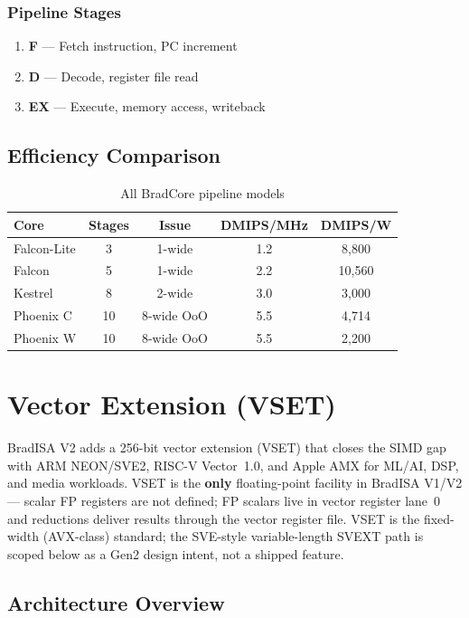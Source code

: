 \documentclass[11pt,a4paper]{article}
\begin{document}
\subsubsection*{Pipeline Stages}
\begin{enumerate}[nosep]
  \item \textbf{F} --- Fetch instruction, PC increment
  \item \textbf{D} --- Decode, register file read
  \item \textbf{EX} --- Execute, memory access, writeback
\end{enumerate}

\subsection{Efficiency Comparison}

\begin{table}[H]
\centering
\caption{All BradCore pipeline models}
\begin{tabular}{lcccc}
\toprule
Core & Stages & Issue & DMIPS/MHz & DMIPS/W \\
\midrule
Falcon-Lite & 3 & 1-wide & 1.2 & 8,800 \\
Falcon & 5 & 1-wide & 2.2 & 10,560 \\
Kestrel & 8 & 2-wide & 3.0 & 3,000 \\
Phoenix C & 10 & 8-wide OoO & 5.5 & 4,714 \\
Phoenix W & 10 & 8-wide OoO & 5.5 & 2,200 \\
\bottomrule
\end{tabular}
\end{table}

\newpage

\section{Vector Extension (VSET)}

BradISA V2 adds a 256-bit vector extension (VSET) that closes the SIMD gap
with ARM NEON/SVE2, RISC-V Vector~1.0, and Apple AMX for ML/AI, DSP, and
media workloads. VSET is the \textbf{only} floating-point facility in
BradISA V1/V2 --- scalar FP registers are not defined; FP scalars live in
vector register lane~0 and reductions deliver results through the vector
register file. VSET is the fixed-width (AVX-class) standard; the SVE-style
variable-length SVEXT path is scoped below as a Gen2 design intent, not a
shipped feature.

\subsection{Architecture Overview}
\end{document}
